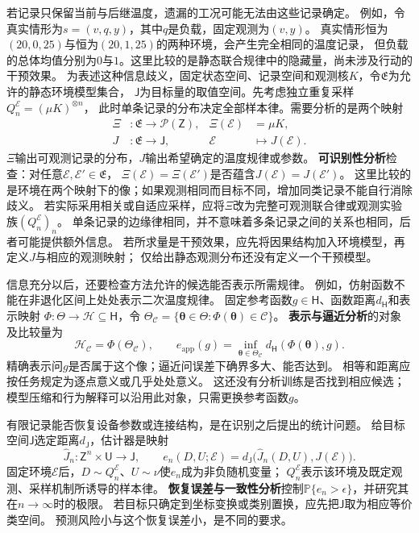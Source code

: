 若记录只保留当前与后继温度，遗漏的工况可能无法由这些记录确定。
例如，令真实情形为$s=(v,q,y)$，其中$q$是负载，固定观测为$(v,y)$。
真实情形恒为$(20,0,25)$与恒为$(20,1,25)$的两种环境，会产生完全相同的温度记录，
但负载的总体均值分别为$0$与$1$。这里比较的是静态联合规律中的隐藏量，尚未涉及行动的干预效果。
为表述这种信息歧义，固定状态空间、记录空间和观测核$K$，令$\mathfrak E$为允许的静态环境模型集合，
$\mathsf J$为目标量的取值空间。先考虑独立重复采样$Q_n^{\mathcal E}=(\mu K)^{\otimes n}$，
此时单条记录的分布决定全部样本律。需要分析的是两个映射
\begin{equation}
  \begin{aligned}
    \Xi&:\mathfrak E\to\mathcal P(\mathsf Z),
      &\Xi(\mathcal E)&=\mu K,\\
    J&:\mathfrak E\to\mathsf J,
      &\mathcal E&\mapsto J(\mathcal E).
  \end{aligned}
  \label{eq:future-task-observation-target-maps}
\end{equation}
$\Xi$输出可观测记录的分布，$J$输出希望确定的温度规律或参数。
\textbf{可识别性分析}检查：对任意$\mathcal E,\mathcal E'\in\mathfrak E$，
$\Xi(\mathcal E)=\Xi(\mathcal E')$是否蕴含$J(\mathcal E)=J(\mathcal E')$。
这里比较的是环境在两个映射下的像；如果观测相同而目标不同，增加同类记录不能自行消除歧义。
若实际采用相关或自适应采样，应将$\Xi$改为完整可观测联合律或观测实验族$(Q_n^{\mathcal E})_n$。
单条记录的边缘律相同，并不意味着多条记录之间的关系也相同，后者可能提供额外信息。
若所求量是干预效果，应先将因果结构加入环境模型，再定义$J$与相应的观测映射；
仅给出静态观测分布还没有定义一个干预模型。

信息充分以后，还要检查方法允许的候选能否表示所需规律。
例如，仿射函数不能在非退化区间上处处表示二次温度规律。
固定参考函数$g\in\mathsf H$、函数距离$d_{\mathsf H}$和表示映射
$\Phi:\Theta\to\mathcal H\subseteq\mathsf H$，令
$\Theta_{\mathcal C}=\{\bm\theta\in\Theta:\Phi(\bm\theta)\in\mathcal C\}$。
\textbf{表示与逼近分析}的对象及比较量为
\[
  \mathcal H_{\mathcal C}=\Phi(\Theta_{\mathcal C}),\qquad
  e_{\mathrm{app}}(g)=
  \inf_{\bm\theta\in\Theta_{\mathcal C}}
       d_{\mathsf H}(\Phi(\bm\theta),g).
\]
精确表示问$g$是否属于这个像；逼近问误差下确界多大、能否达到。
相等和距离应按任务规定为逐点意义或几乎处处意义。
这还没有分析训练是否找到相应候选；模型压缩和行为解释可以沿用此对象，只需更换参考函数$g$。

有限记录能否恢复设备参数或连接结构，是在识别之后提出的统计问题。
给目标空间$\mathsf J$选定距离$d_{\mathsf J}$，估计器是映射
\[
  \widehat J_n:\mathsf Z^n\times\mathsf U\to\mathsf J,
  \qquad
  e_n(D,U;\mathcal E)=
  d_{\mathsf J}\bigl(\widehat J_n(D,U),J(\mathcal E)\bigr).
\]
固定环境$\mathcal E$后，$D\sim Q_n^{\mathcal E}$、$U\sim\nu$使$e_n$成为非负随机变量；
$Q_n^{\mathcal E}$表示该环境及既定观测、采样机制所诱导的样本律。
\textbf{恢复误差与一致性分析}控制$\mathbb P\{e_n>\epsilon\}$，并研究其在$n\to\infty$时的极限。
若目标只确定到坐标变换或类别置换，应先把$\mathsf J$取为相应等价类空间。
预测风险小与这个恢复误差小，是不同的要求。

